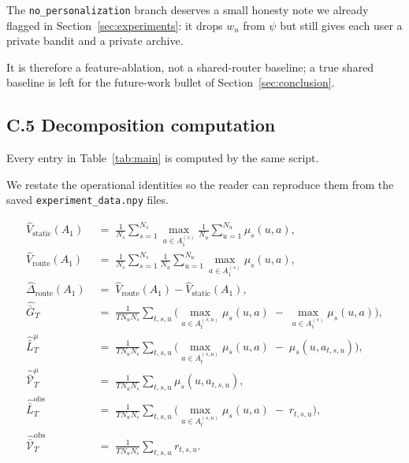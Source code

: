 \documentclass{article} %
\begin{document}
The \texttt{no\_personalization} branch deserves a small honesty note we already flagged in Section~\ref{sec:experiments}: it drops $w_u$ from $\psi$ but still gives each user a private bandit and a private archive.

It is therefore a feature-ablation, not a shared-router baseline; a true shared baseline is left for the future-work bullet of Section~\ref{sec:conclusion}.

\subsection{C.5 Decomposition computation}

\label{app:impl-decomp}

Every entry in Table~\ref{tab:main} is computed by the same script.

We restate the operational identities so the reader can reproduce them from the saved \texttt{experiment\_data.npy} files.

\begin{align}
\label{eq:app-impl-vstatic}
\widehat V_{\mathrm{static}}(A_1) &\;=\; \frac{1}{N_s}\sum_{s=1}^{N_s}
\max_{a \in A_1^{(s)}}\frac{1}{N_u}\sum_{u=1}^{N_u}\mu_s(u,a),\\
\label{eq:app-impl-vroute}
\widehat V_{\mathrm{route}}(A_1) &\;=\; \frac{1}{N_s}\sum_{s=1}^{N_s}
\frac{1}{N_u}\sum_{u=1}^{N_u}\max_{a \in A_1^{(s)}}\mu_s(u,a),\\
\label{eq:app-impl-dhet}
\widehat\Delta_{\mathrm{route}}(A_1) &\;=\; \widehat V_{\mathrm{route}}(A_1) - \widehat V_{\mathrm{static}}(A_1),\\
\label{eq:app-impl-Gt}
\widehat{\bar G}_T &\;=\; \frac{1}{T N_u N_s}\sum_{t,s,u}\!\Big(\max_{a \in A_t^{(s,u)}}\mu_s(u, a) \;-\; \max_{a \in A_1^{(s)}}\mu_s(u, a)\Big),\\
\label{eq:app-impl-Lt-mean}
\widehat{\bar L}_T^\mu &\;=\; \frac{1}{T N_u N_s}\sum_{t,s,u}\!\Big(\max_{a \in A_t^{(s,u)}}\mu_s(u, a) \;-\; \mu_s(u,a_{t,s,u})\Big),\\
\label{eq:app-impl-V-mean}
\widehat{\bar{\mathcal V}}_T^\mu &\;=\; \frac{1}{T N_u N_s}\sum_{t,s,u}\mu_s(u,a_{t,s,u}),\\
\label{eq:app-impl-Lt}
\widehat{\bar L}_T^{\mathrm{obs}} &\;=\; \frac{1}{T N_u N_s}\sum_{t,s,u}\!\Big(\max_{a \in A_t^{(s,u)}}\mu_s(u, a) \;-\; r_{t,s,u}\Big),\\
\label{eq:app-impl-V}
\widehat{\bar{\mathcal V}}_T^{\mathrm{obs}} &\;=\; \frac{1}{T N_u N_s}\sum_{t,s,u} r_{t,s,u}.
\end{align}
\end{document}
